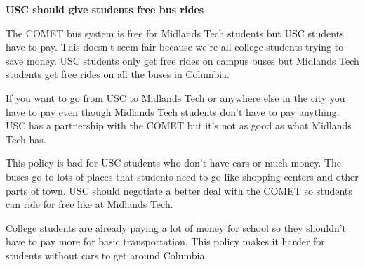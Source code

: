 \documentclass[12pt]{article}
\begin{document}
\newpage
\begin{originalversion}
\textbf{USC should give students free bus rides}

The COMET bus system is free for Midlands Tech students but USC students have to pay. This doesn't seem fair because we're all college students trying to save money. USC students only get free rides on campus buses but Midlands Tech students get free rides on all the buses in Columbia.

If you want to go from USC to Midlands Tech or anywhere else in the city you have to pay even though Midlands Tech students don't have to pay anything. USC has a partnership with the COMET but it's not as good as what Midlands Tech has.

This policy is bad for USC students who don't have cars or much money. The buses go to lots of places that students need to go like shopping centers and other parts of town. USC should negotiate a better deal with the COMET so students can ride for free like at Midlands Tech.

College students are already paying a lot of money for school so they shouldn't have to pay more for basic transportation. This policy makes it harder for students without cars to get around Columbia.
\end{originalversion}
\newpage
\end{document}
